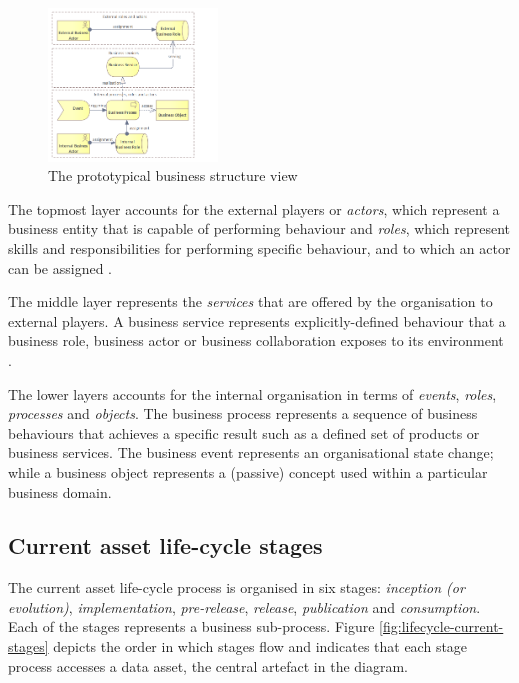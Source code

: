 	\begin{figure}[h]
		\centering
		\includegraphics[width=0.4\textwidth]{images/views/Business view.png}
		\caption{The prototypical business structure view}
		\label{fig:business-structure-protopypical}
	\end{figure} 
	
	The topmost layer accounts for the external players or \textit{actors}, which represent a business entity that is capable of performing behaviour and \textit{roles}, which represent skills and responsibilities for performing specific behaviour, and to which an actor can be assigned \citep{archimate3.1}. 
	
	The middle layer represents the \textit{services} that are offered by the organisation to external players. A business service represents explicitly-defined behaviour that a business role, business actor or business collaboration exposes to its environment \citep{archimate3.1}.
	

	
	The lower layers accounts for the internal organisation in terms of \textit{events}, \textit{roles}, \textit{processes} and \textit{objects}. The business process represents a sequence of business behaviours that achieves a specific result such as a defined set of products or business services. The business event represents an organisational state change; while a business object represents a (passive) concept used within a particular business domain.
	

	\subsection{Current asset life-cycle stages}
	\label{sec:lifecycle-current-stages}
	
	The current asset life-cycle process is organised in six stages: \textit{inception (or evolution)}, \textit{implementation}, \textit{pre-release}, \textit{release}, \textit{publication} and \textit{consumption}. Each of the stages represents a business sub-process. Figure \ref{fig:lifecycle-current-stages} depicts the order in which stages flow and indicates that each stage process accesses a data asset, the central artefact in the diagram.
	
